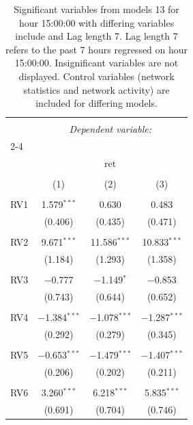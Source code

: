 
\begin{table}[!htbp] \centering 
  \caption{Significant variables from models 13 for hour 15:00:00 with differing variables include 
                               and Lag length 7. Lag length 7 refers to the past 7 hours regressed on hour 15:00:00. 
                               Insignificant variables are not displayed. 
                               Control variables (network statistics and network activity) are 
                               included for differing models.} 
  \label{RVmodels2_t_hourlagged2} 
\scriptsize 
\begin{tabular}{@{\extracolsep{5pt}}lccc} 
\\[-1.8ex]\hline 
\hline \\[-1.8ex] 
 & \multicolumn{3}{c}{\textit{Dependent variable:}} \\ 
\cline{2-4} 
\\[-1.8ex] & \multicolumn{3}{c}{ret} \\ 
\\[-1.8ex] & (1) & (2) & (3)\\ 
\hline \\[-1.8ex] 
 RV1 & 1.579$^{***}$ & 0.630 & 0.483 \\ 
  & (0.406) & (0.435) & (0.471) \\ 
  & & & \\ 
 RV2 & 9.671$^{***}$ & 11.586$^{***}$ & 10.833$^{***}$ \\ 
  & (1.184) & (1.293) & (1.358) \\ 
  & & & \\ 
 RV3 & $-$0.777 & $-$1.149$^{*}$ & $-$0.853 \\ 
  & (0.743) & (0.644) & (0.652) \\ 
  & & & \\ 
 RV4 & $-$1.384$^{***}$ & $-$1.078$^{***}$ & $-$1.287$^{***}$ \\ 
  & (0.292) & (0.279) & (0.345) \\ 
  & & & \\ 
 RV5 & $-$0.653$^{***}$ & $-$1.479$^{***}$ & $-$1.407$^{***}$ \\ 
  & (0.206) & (0.202) & (0.211) \\ 
  & & & \\ 
 RV6 & 3.260$^{***}$ & 6.218$^{***}$ & 5.835$^{***}$ \\ 
  & (0.691) & (0.704) & (0.746) \\ 

\end{tabular}
\end{table}
